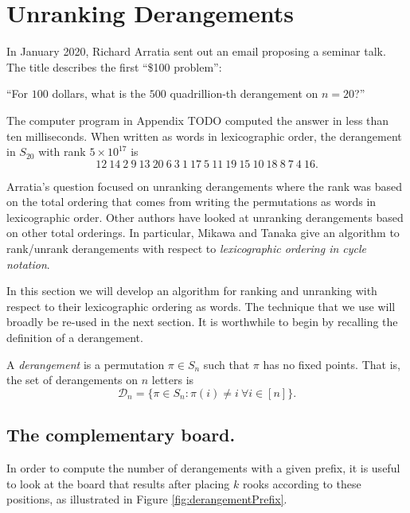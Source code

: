 \section{Unranking Derangements}

In January 2020, Richard Arratia sent out an email proposing a seminar talk.
The title describes the first ``\$100 problem'':
\begin{problem}
``For $100$ dollars, what is the $500$ quadrillion-th derangement on $n=20$?''
\end{problem}

\begin{answer}
The computer program in Appendix TODO computed the answer in less than ten
milliseconds. When written as words in lexicographic order, the
derangement in $S_{20}$ with rank $5 \times 10^{17}$ is \[
  12\ 14\ 2\ 9\ 13\ 20\ 6\ 3\ 1\ 17\ 5\ 11\ 19\ 15\ 10\ 18\ 8\ 7\ 4\ 16.
\]
\end{answer}

Arratia's question focused on unranking derangements where the rank was
based on the total ordering that comes from writing the
permutations as words in lexicographic order.
Other authors have looked at unranking derangements based on other total
orderings. In particular, Mikawa and Tanaka \cite{Mikawa2014} give an algorithm
to rank/unrank derangements
with respect to \textit{lexicographic ordering in cycle notation}.

In this section we will develop an algorithm for ranking and unranking with
respect to their lexicographic ordering as words. The technique that we use will
broadly be re-used in the next section.
It is worthwhile to begin by recalling the definition of a derangement.
\begin{definition}
  A \textit{derangement} is a permutation $\pi \in S_n$ such that $\pi$ has no
  fixed points. That is, the set of derangements on $n$ letters is \[
    \mathcal{D}_n = \{\pi \in S_n : \pi(i) \neq i\ \forall i \in [n]\}.
  \]
\end{definition}

\subsection{The complementary board.}
In order to compute the number of derangements with a given prefix, it is
useful to look at the board that results after placing $k$ rooks according to
these positions, as illustrated in Figure \ref{fig:derangementPrefix}.



